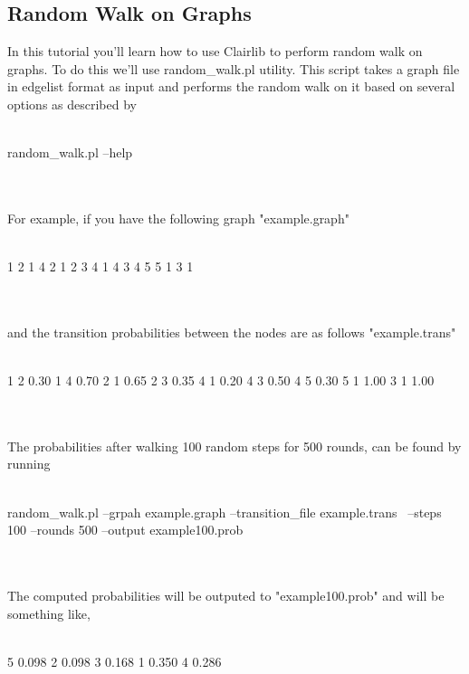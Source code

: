 \subsection{Random Walk on Graphs}
In this tutorial you'll learn how to use Clairlib to perform random walk on graphs. 
To do this we'll use random\_walk.pl utility. 
This script takes a graph file in edgelist format as input and performs the random walk on 
it based on several options as described by
\\
\\
\begin{boxedverbatim}
 random_walk.pl --help
\end{boxedverbatim}
\\
\\
For example, if you have the following graph "example.graph"
\\
\\
\begin{boxedverbatim}
 1 2                
 1 4
 2 1
 2 3
 4 1
 4 3
 4 5
 5 1
 3 1
\end{boxedverbatim}
\\
\\
and the transition probabilities between the nodes are as follows "example.trans"
\\
\\
\begin{boxedverbatim}
 1 2 0.30           
 1 4 0.70
 2 1 0.65
 2 3 0.35
 4 1 0.20
 4 3 0.50
 4 5 0.30
 5 1 1.00
 3 1 1.00
\end{boxedverbatim}
\\
\\
The probabilities after walking 100 random steps for 500 rounds, can be found by running
\\
\\
\begin{boxedverbatim}
 random_walk.pl --grpah example.graph --transition_file example.trans \
 --steps 100 --rounds 500 --output example100.prob
\end{boxedverbatim}
\\
\\
The computed probabilities will be outputed to "example100.prob" and will be something like,
\\
\\
\begin{boxedverbatim}
 5 0.098            
 2 0.098         
 3 0.168         
 1 0.350       
 4 0.286
\end{boxedverbatim}
\\
